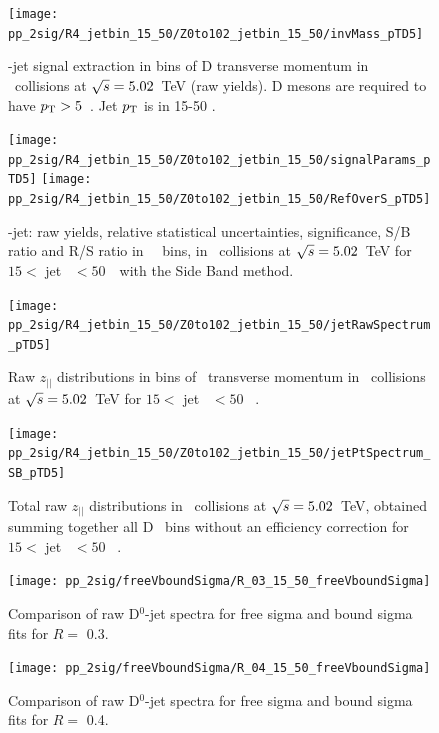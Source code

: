\begin{figure}[bth]
\centering
\begin{minipage}{.65\textwidth}
  \centering
  \texttt{[image: pp\_2sig/R4\_jetbin\_15\_50/Z0to102\_jetbin\_15\_50/invMass\_pTD5]}
\caption{\Dzero-jet signal extraction in bins of D transverse momentum in \pp\ collisions at $\sqrt{s}=5.02$~TeV (raw yields). D mesons are required to have $p_{\rm T}>5$~\GeVc. Jet $p_{\rm T}$ is in 15-50 \GeVc.
}
\label{fig:eq_pp_InvMass_Dzero_15_50_R4}
\end{minipage}%
\begin{minipage}{.4\textwidth}
  \centering
  \texttt{[image: pp\_2sig/R4\_jetbin\_15\_50/Z0to102\_jetbin\_15\_50/signalParams\_pTD5]}
  \texttt{[image: pp\_2sig/R4\_jetbin\_15\_50/Z0to102\_jetbin\_15\_50/RefOverS\_pTD5]}
\caption{%
\Dzero-jet: raw yields, relative statistical uncertainties, significance, S/B ratio and R/S ratio in \Dzero\ \pt\ bins, in \pp\ collisions at $\sqrt{s}=5.02$~TeV for $15<$ jet \pt\ $<50$~\GeVc\ with the Side Band method.
}
\label{fig:eq_pp_signalParams_15_50_R4}
\end{minipage}
\end{figure}
\begin{figure}[bth]
\centering
\begin{minipage}{.65\textwidth}
  \centering
\texttt{[image: pp\_2sig/R4\_jetbin\_15\_50/Z0to102\_jetbin\_15\_50/jetRawSpectrum\_pTD5]}
\caption{Raw $z_{||}$ distributions in bins of \Dzero\ transverse momentum in \pp\ collisions at $\sqrt{s}=5.02$~TeV for $15<$ jet \pt\ $<50$ \GeVc\ .}
\label{fig:eq_pp_signBkgJet_Dzero_15_50_R4}
\end{minipage}%
\begin{minipage}{.4\textwidth}
  \centering
\texttt{[image: pp\_2sig/R4\_jetbin\_15\_50/Z0to102\_jetbin\_15\_50/jetPtSpectrum\_SB\_pTD5]}
\caption{Total raw $z_{||}$ distributions in \pp\ collisions at $\sqrt{s}=5.02$~TeV, obtained summing together all D \pt\ bins without an efficiency correction for $15<$ jet \pt\ $<50$ \GeVc\ .
}
\label{fig:eq_pp_signBkgJet_tot_15_50_R4}
\end{minipage}
\end{figure}

\begin{figure}[bth]
\centering
\begin{minipage}{.5\textwidth}
  \texttt{[image: pp\_2sig/freeVboundSigma/R\_03\_15\_50\_freeVboundSigma]}
\caption{Comparison of raw D$^0$-jet spectra for free sigma and bound sigma fits for $R=$ 0.3.
}
\label{fig:freeVbound_R3}
\end{minipage}%
\begin{minipage}{.5\textwidth}
  \centering
  \texttt{[image: pp\_2sig/freeVboundSigma/R\_04\_15\_50\_freeVboundSigma]}
\caption{Comparison of raw D$^0$-jet spectra for free sigma and bound sigma fits for $R=$ 0.4.
}
\label{fig:freeVbound_R4}
\end{minipage}
\end{figure}

